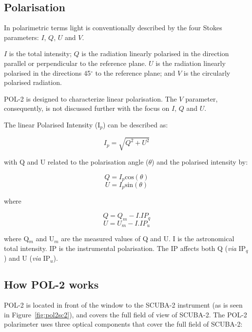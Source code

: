 \subsection*{Polarisation}

In polarimetric terms light is conventionally described by the four
Stokes parameters: $I$, $Q$, $U$ and $V$.


$I$ is the total intensity; $Q$ is the radiation linearly polarised in
the direction parallel or perpendicular to the reference plane. $U$ is
the radiation linearly polarised in the directions 45$^{\circ }$ to
the reference plane; and $V$ is the circularly polarised radiation.

POL-2 is designed to characterize linear polarisation.  The $V$
parameter, consequently, is not discussed further with the focus on $I$,
$Q$ and $U$.

The linear Polarised Intensity (I$_{p}$) can be described as:

\begin{equation}
I_{p} = \sqrt{Q^{2}+U^{2}}
\end{equation}

with Q and U related to the polarisation angle ($\theta$)
and the polarised intensity by:

\begin{equation}
Q = I_{p} \text{cos}(\theta)
\end{equation}
\begin{equation}
U = I_{p} \text{sin}(\theta)
\end{equation}

where

\begin{equation}
Q = Q_{m} - I . IP_{q}
\end{equation}
\begin{equation}
U = U_{m} - I . IP_{u}
\end{equation}

where Q$_{m}$ and U$_{m}$ are the measured values of Q and U.  I is
the astronomical total intensity.  IP is the instrumental
polarisation. The IP affects both Q (\emph{via} IP$_{q}$) and U
(\emph{via} IP$_{u}$).


\subsection*{How POL-2 works}

POL-2 is located in front of the window to the SCUBA-2 instrument (as
is seen in Figure~\ref{fig:pol2sc2}), and covers the full field of
view of SCUBA-2. The POL-2 polarimeter uses three optical components
that cover the full field of SCUBA-2:

